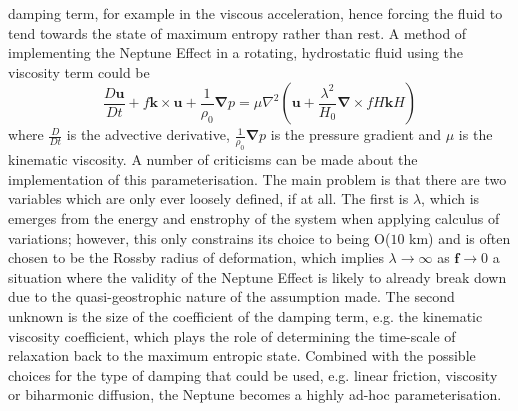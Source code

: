 \documentclass[12pt,a4paper]{report}
\begin{document}
                	 damping term, for example in the viscous acceleration, hence forcing
                	  the fluid to tend towards the state of maximum entropy rather than rest.  
                	A method of implementing the Neptune Effect in a rotating, hydrostatic fluid using the viscosity term could be
                	\begin{equation}
                	\frac{D \boldsymbol{u}}{Dt}
                		+f\boldsymbol{k}\times\boldsymbol{u}+
                		\frac{1}{\rho_{0}}\boldsymbol{\nabla}p
                		 = \mu \nabla^{2}\left(\boldsymbol{u}
                		+\frac{\lambda^{2}}{H_{0}}
                		\boldsymbol{\nabla}\times fH\boldsymbol{k}H\right)
                	\end{equation}
                	where $\frac{D }{Dt}$ is the advective derivative, 
                	$\frac{1}{\rho_{0}}\boldsymbol{\nabla}p$ is the pressure gradient and
                	$\mu $ is the kinematic viscosity.
                	 A number of criticisms can be made about the implementation of this
                	  parameterisation. The main problem is that there are two variables
                	   which are only ever loosely defined, if at all. The first is
                	    $\lambda$, which is emerges from the energy and enstrophy of the
                	     system when applying calculus of variations; however, this only
                	      constrains its choice to being  O($10$ km) and is often chosen to
                	       be the Rossby radius of deformation, which implies $\lambda
                	        \rightarrow \infty$ as  $\boldsymbol{f} \rightarrow 0$   a
                	         situation where the validity of the Neptune Effect is likely to already break down due to the quasi-geostrophic nature of
                	          the assumption made. The second unknown is the size of the
                	           coefficient of the damping term, e.g. the kinematic
                	            viscosity coefficient, which plays the role of determining
                	             the time-scale of relaxation back to the maximum entropic
                	              state. Combined with the possible choices for the type of
                	               damping that could be used, e.g. linear friction,
                	                viscosity or biharmonic diffusion, the Neptune becomes
                	                 a highly ad-hoc parameterisation. 
                	 
\end{document}
